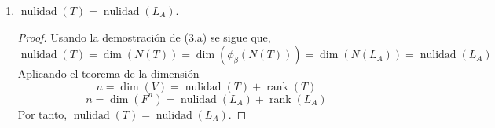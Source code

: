 \documentclass[letterpaper]{article}
\DeclareMathOperator{\rank}{rank}
\DeclareMathOperator{\nulidad}{nulidad}
\begin{document}
\begin{enumerate}
\begin{enumerate}[label=(\alph*)]
    \begin{proof}
    Consideremos $\phi_\beta : V \to F^n$ la transformación lineal definida como $\phi_\beta(v) = [v]_\beta$
    y $\phi_\gamma : V \to F^m$ la transformaciónl lineal definida como $\phi_\gamma(w) = [w]_\gamma$.
    Estas transformaciones son isomorfismos entre sus respectivos espacios.
    
    Por demostrar que $\phi_\beta(N(T)) = N(L_A)$,
    \begin{itemize}
        \item[$(\subseteq)$] Sea $x \in \phi_\beta(N(T))$. Como $\phi_\beta$ es isomorfa entre $V$ y $F^n$
        existe un único $v \in N(T)$ tal que $\phi_\beta(v) = [v]_\beta = x$. Ahora como $v \in N(T)$,
        $T(v) = 0_W$. Se tiene que
        $0_{F^m} = [0_W]_\gamma = [T(v)]_\gamma = [T]_\beta^\gamma [v]_\beta = Ax$. Por tanto $x \in N(L_A)$.
        
        \item[$(\supseteq)$] Sea $x \in N(L_A)$. Sea $v \in V$ sea el único vector tal que
        $\phi_\beta(v) = [v]\beta = x$. Entonces se tiene que
        $0_{F^m} = Ax = [T]_\beta^\gamma [v]_\beta = [T(v)]_\gamma = \phi_\gamma(T(v))$.
        Como $\phi_\gamma$ es un isomorfismo, $T(v) = 0_W$. Por tanto $v \in N(T)$, lo que implica que
        $x \in \phi_\beta(N(T))$.
    \end{itemize}
    \end{proof}
    
    \item $\nulidad(T) = \nulidad(L_A)$.
    
    \begin{proof}
    Usando la demostración de (3.a) se sigue que,
    $$ \nulidad(T) = \dim(N(T)) = \dim(\phi_\beta(N(T))) = \dim(N(L_A)) = \nulidad(L_A) $$
    Aplicando el teorema de la dimensión
    $$ n = \dim(V) = \nulidad(T) + \rank(T) $$
    $$ n = \dim(F^n) = \nulidad(L_A) + \rank(L_A) $$
    Por tanto, $\nulidad(T) = \nulidad(L_A)$.
    \end{proof}
\end{enumerate}

\end{enumerate}




\end{document}
